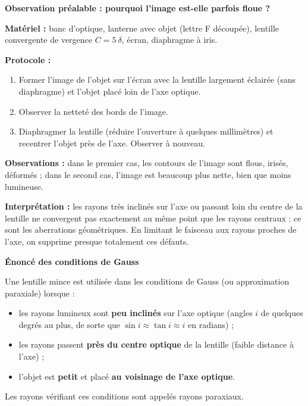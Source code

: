 \documentclass[11pt]{article}
\newcommand{\cle}[1]{{\popxbold\color{popdark}#1}}
\newcounter{popsec}
\newcounter{popsub}
\newcommand{\courssub}[1]{%
  \stepcounter{popsub}%
  \par\vspace{9pt}\noindent{\popxbold\fontsize{11.5}{13}\selectfont\color{popink}{\color{poporange}\thepopsec.\thepopsub}\hspace{6pt}#1}\par\nopagebreak\vspace{4pt}
}
\begin{document}
\courssub{Les conditions de Gauss}

\textbf{Observation préalable : pourquoi l'image est-elle parfois floue ?}\par

\begin{experience}
\textbf{Matériel :} banc d'optique, lanterne avec objet (lettre F découpée), lentille convergente de vergence $C = 5\ \delta$, écran, diaphragme à iris.

\textbf{Protocole :}
\begin{enumerate}
\item Former l'image de l'objet sur l'écran avec la lentille largement éclairée (sans diaphragme) et l'objet placé loin de l'axe optique.
\item Observer la netteté des bords de l'image.
\item Diaphragmer la lentille (réduire l'ouverture à quelques millimètres) et recentrer l'objet près de l'axe. Observer à nouveau.
\end{enumerate}

\textbf{Observations :} dans le premier cas, les contours de l'image sont flous, irisés, déformés ; dans le second cas, l'image est beaucoup plus nette, bien que moins lumineuse.

\textbf{Interprétation :} les rayons très inclinés sur l'axe ou passant loin du centre de la lentille ne convergent pas exactement au même point que les rayons centraux : ce sont les \cle{aberrations géométriques}. En limitant le faisceau aux rayons proches de l'axe, on supprime presque totalement ces défauts.
\end{experience}

\textbf{Énoncé des conditions de Gauss}\par

\begin{definition}
Une lentille mince est utilisée dans les \cle{conditions de Gauss} (ou approximation \cle{paraxiale}) lorsque :
\begin{itemize}
\item les rayons lumineux sont \textbf{peu inclinés} sur l'axe optique (angles $i$ de quelques degrés au plus, de sorte que $\sin i \approx \tan i \approx i$ en radians) ;
\item les rayons passent \textbf{près du centre optique} de la lentille (faible distance à l'axe) ;
\item l'objet est \textbf{petit} et placé \textbf{au voisinage de l'axe optique}.
\end{itemize}
Les rayons vérifiant ces conditions sont appelés \cle{rayons paraxiaux}.
\end{definition}
\end{document}
